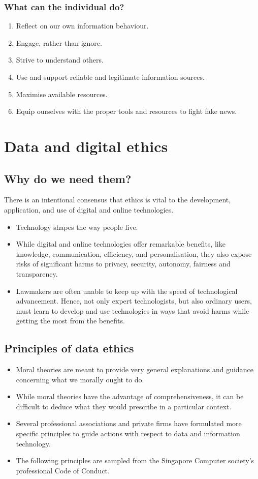 \documentclass[11pt]{article}
\begin{document}
\subsubsection{What can the individual do?}
\label{sec:org164b4c9}
\begin{enumerate}
\item Reflect on our own information behaviour.
\item Engage, rather than ignore.
\item Strive to understand others.
\item Use and support reliable and legitimate information sources.
\item Maximise available resources.
\item Equip ourselves with the proper tools and resources to fight fake news.
\end{enumerate}
\section{Data and digital ethics}
\label{sec:org37d56ff}

\subsection{Why do we need them?}
\label{sec:orgb196d96}
There is an intentional consensus that ethics is vital to the development, application, and use of digital and online technologies.
\begin{itemize}
\item Technology shapes the way people live.
\item While digital and online technologies offer remarkable benefits, like knowledge, communication, efficiency, and personalisation, they also expose risks of significant harms to privacy, security, autonomy, fairness and transparency.
\item Lawmakers are often unable to keep up with the speed of technological advancement. Hence, not only expert technologists, but also ordinary users, must learn to develop and use technologies in ways that avoid harms while getting the most from the benefits.
\end{itemize}

\clearpage
\subsection{Principles of data ethics}
\label{sec:org068fca3}
\begin{itemize}
\item Moral theories are meant to provide very general explanations and guidance concerning what we morally ought to do.
\item While moral theories have the advantage of comprehensiveness, it can be difficult to deduce what they would prescribe in a particular context.
\item Several professional associations and private firms have formulated more specific principles to guide actions with respect to data and information technology.
\item The following principles are sampled from the Singapore Computer society's professional Code of Conduct.
\end{itemize}
\end{document}
